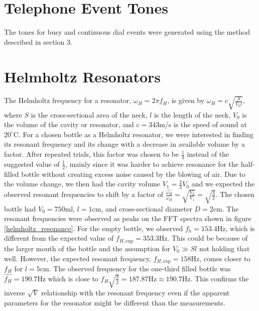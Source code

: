 \documentclass[10pt]{article}
\begin{document}
\section{Telephone Event Tones}
The tones for busy and continuous dial events were generated using the method described in section 3.

\section{Helmholtz Resonators}
The Helmholtz frequency for a resonator, $\omega_H = 2\pi f_H$, is given by $\omega_H = c\sqrt{\frac{S}{V_0l}}$, where $S$ is the cross-sectional area of the neck, $l$ is the length of the neck, $V_0$ is the volume of the cavity or resonator, and $c=343$m/s is the speed of sound at $20^\circ$C. For a chosen bottle as a Helmholtz resonator, we were interested in finding its resonant frequency and its change with a decrease in available volume by a factor. After repeated trials, this factor was chosen to be $\frac{1}{3}$ instead of the suggested value of $\frac{1}{2}$, mainly since it was harder to achieve resonance for the half-filled bottle without creating excess noise caused by the blowing of air. Due to the volume change, we then had the cavity volume $V_1 = \frac{2}{3}V_0$ and we expected the observed resonant frequencies to shift by a factor of $\frac{\widehat{\omega_H}}{\omega_H} = \sqrt{\frac{V_0}{V_1}} = \sqrt{\frac{3}{2}}$. The chosen bottle had $V_0 = 750$ml, $l=1$cm, and cross-sectional diameter $D=2$cm. The resonant frequencies were observed as peaks on the FFT spectra shown in figure \ref{helmholtz_resonance}. For the empty bottle, we observed $f_h = 153.4$Hz, which is different from the expected value of $f_{H, \text{exp}} = 353.3$Hz. This could be because of the larger mouth of the bottle and the assumption for $V_0 \gg Sl$ not holding that well. However, the expected resonant frequency, $f_{H, \text{exp}} = 158$Hz, comes closer to $f_{H}$ for $l=5$cm. The observed frequency for the one-third filled bottle was $\widehat{f_H} = 190.7$Hz which is close to $f_H\sqrt{\frac{3}{2}} = 187.87\text{Hz} \approx 190.7$Hz. This confirms the inverse $\sqrt{V}$ relationship with the resonant frequency even if the apparent parameters for the resonator might be different than the measurements.
\end{document}
